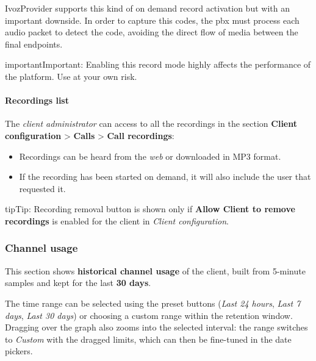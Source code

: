 \documentclass[letterpaper,10pt,english]{sphinxmanual}
\begin{document}
IvozProvider supports this kind of on demand record activation but with an
important downside. In order to capture this codes, the pbx must process each
audio packet to detect the code, avoiding the direct flow of media between the
final endpoints.

\begin{notice}{important}{Important:}
Enabling this record mode highly affects the performance of the
platform. Use at your own risk.
\end{notice}


\paragraph{Recordings list}
\label{administration_portal/client/residential/calls/call_recordings:recordings-list}
The \emph{client administrator} can access to all the recordings in the section
\textbf{Client configuration} \textgreater{} \textbf{Calls} \textgreater{} \textbf{Call recordings}:
\begin{itemize}
\item {} 
Recordings can be heard from the \emph{web} or downloaded in MP3 format.

\item {} 
If the recording has been started on demand, it will also include the user
that requested it.

\end{itemize}

\begin{notice}{tip}{Tip:}
Recording removal button is shown only if \textbf{Allow Client to remove recordings} is enabled
for the client in \emph{Client configuration}.
\end{notice}


\subsubsection{Channel usage}
\label{administration_portal/client/residential/calls/channel_usage:channel-usage}\label{administration_portal/client/residential/calls/channel_usage::doc}
This section shows \textbf{historical channel usage} of the client, built from 5-minute samples and kept for the last
\textbf{30 days}.

The time range can be selected using the preset buttons (\emph{Last 24 hours}, \emph{Last 7 days}, \emph{Last 30 days}) or choosing
a custom range within the retention window. Dragging over the graph also zooms into the selected interval: the range
switches to \emph{Custom} with the dragged limits, which can then be fine-tuned in the date pickers.
\end{document}

